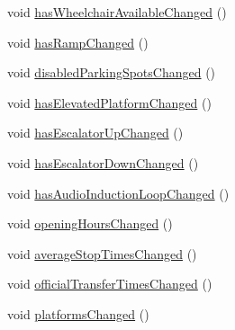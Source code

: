 \begin{DoxyCompactItemize}
\item 
void \mbox{\hyperlink{classQRail_1_1StationEngine_1_1Station_ab9dbccc3c22e2f85f02598e188b30e1f}{has\+Wheelchair\+Available\+Changed}} ()
\item 
void \mbox{\hyperlink{classQRail_1_1StationEngine_1_1Station_ab062941ecd9106dacafa586ab6902bfb}{has\+Ramp\+Changed}} ()
\item 
void \mbox{\hyperlink{classQRail_1_1StationEngine_1_1Station_a10925196dc9a1414b0e1777e080cfd24}{disabled\+Parking\+Spots\+Changed}} ()
\item 
void \mbox{\hyperlink{classQRail_1_1StationEngine_1_1Station_aef8be214289efd0d14dd303018ad4fbb}{has\+Elevated\+Platform\+Changed}} ()
\item 
void \mbox{\hyperlink{classQRail_1_1StationEngine_1_1Station_a1f352fe7283ca3d3d0c37bfc8f614638}{has\+Escalator\+Up\+Changed}} ()
\item 
void \mbox{\hyperlink{classQRail_1_1StationEngine_1_1Station_a905a7e763de04a36cd12ea8b8b8ad47d}{has\+Escalator\+Down\+Changed}} ()
\item 
void \mbox{\hyperlink{classQRail_1_1StationEngine_1_1Station_aa4438de170a13eaeca8768b7cd7e9de0}{has\+Audio\+Induction\+Loop\+Changed}} ()
\item 
void \mbox{\hyperlink{classQRail_1_1StationEngine_1_1Station_a6dda0c58b3e6e9cbb4d4868ab785b088}{opening\+Hours\+Changed}} ()
\item 
void \mbox{\hyperlink{classQRail_1_1StationEngine_1_1Station_a090521d89bd6795fbf096607e8c7ad1f}{average\+Stop\+Times\+Changed}} ()
\item 
void \mbox{\hyperlink{classQRail_1_1StationEngine_1_1Station_adae404be1a36e3ef4298afb7bf062f2f}{official\+Transfer\+Times\+Changed}} ()
\item 
void \mbox{\hyperlink{classQRail_1_1StationEngine_1_1Station_a2e20934310ee8ab026ef4334fd99cdbd}{platforms\+Changed}} ()
\end{DoxyCompactItemize}
